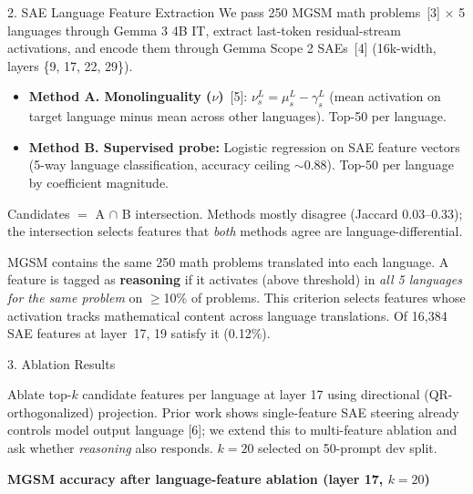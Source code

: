 \documentclass[final]{beamer}
\newlength{\colwidth}
\begin{document}
\begin{frame}[t]
\begin{columns}[t]
\begin{column}{\colwidth}
\begin{block}{2. SAE Language Feature Extraction}
    We pass 250 MGSM math problems~[3] $\times$ 5 languages through
    Gemma 3 4B IT, extract last-token residual-stream activations, and encode
    them through Gemma Scope 2 SAEs~[4] (16k-width,
    layers \{9, 17, 22, 29\}).

    \begin{itemize}
      \item \textbf{Method A. Monolinguality ($\nu$)}~[5]:
            $\nu_s^L = \mu_s^L - \gamma_s^L$ (mean activation on target language
            minus mean across other languages). Top-50 per language.
      \item \textbf{Method B. Supervised probe:}
            Logistic regression on SAE feature vectors (5-way language
            classification, accuracy ceiling $\sim$0.88). Top-50 per language
            by coefficient magnitude.
    \end{itemize}
    Candidates $=$ A $\cap$ B intersection.
    Methods mostly disagree (Jaccard 0.03--0.33); the intersection selects
    features that \emph{both} methods agree are language-differential.

    MGSM contains the same 250 math problems translated into each language.
    A feature is tagged as \textbf{reasoning} if it activates (above
    threshold) in \emph{all 5 languages for the same problem} on $\geq$10\%
    of problems. This criterion selects features whose activation tracks
    mathematical content across language translations.
    Of 16{,}384 SAE features at layer~17, 19 satisfy it (0.12\%).

  \end{block}

  \begin{block}{3. Ablation Results}

    Ablate top-$k$ candidate features per language at layer 17 using
    directional (QR-orthogonalized) projection. Prior work shows
    single-feature SAE steering already controls model output language
    [6]; we extend this to multi-feature ablation and ask whether
    \emph{reasoning} also responds. $k{=}20$ selected on 50-prompt dev
    split.

    \begin{center}
    {\small\textbf{MGSM accuracy after language-feature ablation (layer 17, $k{=}20$)}}
    \vspace{0.3em}


\end{center}
\end{block}
\end{column}
\end{columns}
\end{frame}
\end{document}
